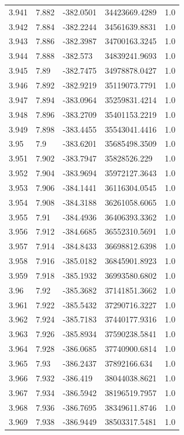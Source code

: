 \begin{tabular}{lllll}
3.941 & 7.882 & -382.0501 & 34423669.4289 & 1.0 \\
3.942 & 7.884 & -382.2244 & 34561639.8831 & 1.0 \\
3.943 & 7.886 & -382.3987 & 34700163.3245 & 1.0 \\
3.944 & 7.888 & -382.573 & 34839241.9693 & 1.0 \\
3.945 & 7.89 & -382.7475 & 34978878.0427 & 1.0 \\
3.946 & 7.892 & -382.9219 & 35119073.7791 & 1.0 \\
3.947 & 7.894 & -383.0964 & 35259831.4214 & 1.0 \\
3.948 & 7.896 & -383.2709 & 35401153.2219 & 1.0 \\
3.949 & 7.898 & -383.4455 & 35543041.4416 & 1.0 \\
3.95 & 7.9 & -383.6201 & 35685498.3509 & 1.0 \\
3.951 & 7.902 & -383.7947 & 35828526.229 & 1.0 \\
3.952 & 7.904 & -383.9694 & 35972127.3643 & 1.0 \\
3.953 & 7.906 & -384.1441 & 36116304.0545 & 1.0 \\
3.954 & 7.908 & -384.3188 & 36261058.6065 & 1.0 \\
3.955 & 7.91 & -384.4936 & 36406393.3362 & 1.0 \\
3.956 & 7.912 & -384.6685 & 36552310.5691 & 1.0 \\
3.957 & 7.914 & -384.8433 & 36698812.6398 & 1.0 \\
3.958 & 7.916 & -385.0182 & 36845901.8923 & 1.0 \\
3.959 & 7.918 & -385.1932 & 36993580.6802 & 1.0 \\
3.96 & 7.92 & -385.3682 & 37141851.3662 & 1.0 \\
3.961 & 7.922 & -385.5432 & 37290716.3227 & 1.0 \\
3.962 & 7.924 & -385.7183 & 37440177.9316 & 1.0 \\
3.963 & 7.926 & -385.8934 & 37590238.5841 & 1.0 \\
3.964 & 7.928 & -386.0685 & 37740900.6814 & 1.0 \\
3.965 & 7.93 & -386.2437 & 37892166.634 & 1.0 \\
3.966 & 7.932 & -386.419 & 38044038.8621 & 1.0 \\
3.967 & 7.934 & -386.5942 & 38196519.7957 & 1.0 \\
3.968 & 7.936 & -386.7695 & 38349611.8746 & 1.0 \\
3.969 & 7.938 & -386.9449 & 38503317.5481 & 1.0 \\

\end{tabular}
